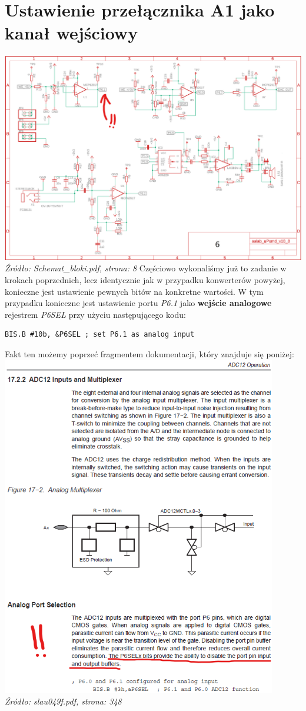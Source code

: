 \documentclass{article}
\begin{document}
\section{Ustawienie przełącznika A1 jako kanał wejściowy}
\includegraphics[width=\textwidth]{"../adc_img/Schemat_bloki_8.png"}
\textit{Źródło: Schemat\_bloki.pdf, strona: 8}
Częściowo wykonaliśmy już to zadanie w krokach poprzednich, lecz identycznie jak w przypadku konwerterów powyżej, konieczne jest ustawienie pewnych bitów na konkretne wartości.
W tym przypadku konieczne jest ustawienie portu \textit{P6.1} jako \textbf{wejście analogowe} rejestrem \textit{P6SEL} przy użyciu następującego kodu:
\begin{verbatim}
BIS.B #10b, &P6SEL ; set P6.1 as analog input \end{verbatim}
Fakt ten możemy poprzeć fragmentem dokumentacji, który znajduje się poniżej: \\
\includegraphics[width=0.9\textwidth]{"../adc_img/slau049f_348.png"} \\
\textit{Źródło: slau049f.pdf, strona: 348}
\end{document}
